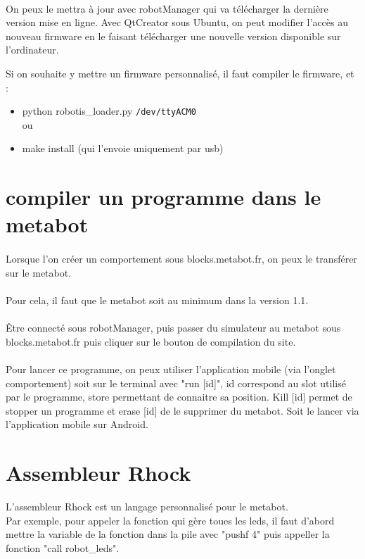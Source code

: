 \documentclass[10pt,a4paper]{report}
\begin{document}
\paragraph{}
On peux le mettra à jour avec robotManager qui va télécharger la dernière version mise en ligne.
Avec QtCreator sous Ubuntu, on peut modifier l'accès au nouveau firmware en le faisant télécharger une nouvelle version disponible sur l'ordinateur.

Si on souhaite y mettre un firmware personnalisé, il faut compiler le firmware, et :
\begin{itemize}
\item python robotis\_loader.py \texttt{/dev/ttyACM0}
\\ou
\item make install (qui l'envoie uniquement par usb)
\end{itemize}

\section{compiler un programme dans le metabot}
\paragraph{}
Lorsque l'on créer un comportement sous blocks.metabot.fr, on peux le transférer sur le metabot.
\paragraph{}
Pour cela, il faut que le metabot soit au minimum dans la version 1.1.
\paragraph{}
Être connecté sous robotManager, puis passer du simulateur au metabot sous blocks.metabot.fr puis cliquer sur le bouton de compilation du site.
\paragraph{}
Pour lancer ce programme, on peux utiliser l'application mobile (via l'onglet comportement) soit sur le terminal avec "run [id]", id correspond au slot utilisé par le programme, store permettant de connaitre sa position. Kill [id] permet de stopper un programme et erase [id] de le supprimer du metabot.
Soit le lancer via l'application mobile sur Android.
\newpage
\section{Assembleur Rhock}
L'assembleur Rhock est un langage personnalisé pour le metabot.\\
Par exemple, pour appeler la fonction qui gère toues les leds, il faut d'abord mettre la variable de la fonction dans la pile avec "pushf 4" puis appeller la fonction "call robot\_leds".
\end{document}
